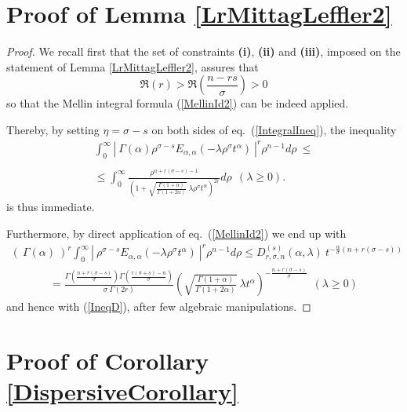 \documentclass{amsart}
\theoremstyle{definition}
\theoremstyle{remark}
\numberwithin{equation}{section}
\begin{document}
{			
			\section{Proof of Lemma \ref{LrMittagLeffler2}}\label{AppendixB}
			
			\begin{proof}
			We recall first that the set of constraints {\bf (i)}, {\bf (ii)} and {\bf (iii)}, imposed on the statement of Lemma \ref{LrMittagLeffler2}, 
			assures that $$\displaystyle \Re(r)>\Re\left(\frac{n-rs}{\sigma}\right)>0$$
			so that the Mellin integral formula (\ref{MellinId2}) can be indeed applied.
			
			Thereby, by setting $\eta=\sigma-s$ on both sides of eq.~(\ref{IntegralIneq}), the inequality 
			\begin{eqnarray*}
				\label{IntegralIneq2}
				\int_0^\infty\left|~\Gamma(\alpha) \rho^{\sigma-s} E_{\alpha,\alpha}(-\lambda \rho^\sigma t^{\alpha})~\right|^r\rho^{n-1}d\rho ~\leq \nonumber \\ \nonumber \\  \leq  \displaystyle \int_0^\infty \frac{\rho^{n+r(\sigma-s)-1}}{\left(1+\sqrt{\frac{\Gamma(1+\alpha)}{\Gamma(1+2\alpha)}}~\lambda \rho^\sigma t^{\alpha}\right)^{2r}} d\rho~~  (  \lambda\geq 0).
			\end{eqnarray*}
			is thus immediate.
			
			Furthermore, by direct application of eq.~(\ref{MellinId2}) we end up with
			\begin{eqnarray*}	\left(~\Gamma(\alpha)~\right)^r\int_0^\infty\left|~\rho^{\sigma-s} E_{\alpha,\alpha}(-\lambda \rho^\sigma t^{\alpha})~\right|^r\rho^{n-1}d\rho \leq D_{r,\sigma,n}^{(s)}(\alpha,\lambda)~ t^{-\frac{\alpha}{\sigma}\left({n+r(\sigma-s)}\right)}
			\end{eqnarray*}
			\begin{eqnarray*}
				= \displaystyle \frac{\Gamma\left(\frac{n+r(\sigma-s)
					}{\sigma}\right)\Gamma\left(\frac{r(\sigma+s)-n}{\sigma}\right)}{\sigma~\Gamma(2r)}\left(\sqrt{\frac{\Gamma(1+\alpha)}{\Gamma(1+2\alpha)}}~\lambda  t^{\alpha}\right)^{-\frac{n+r(\sigma-s)}{\sigma}} \displaystyle~~(\lambda\geq 0)
			\end{eqnarray*}
			and hence with (\ref{IneqD}), after few algebraic manipulations.
		\end{proof}
			
			\section{Proof of Corollary \ref{DispersiveCorollary}}\label{AppendixC}
			
}
\end{document}
